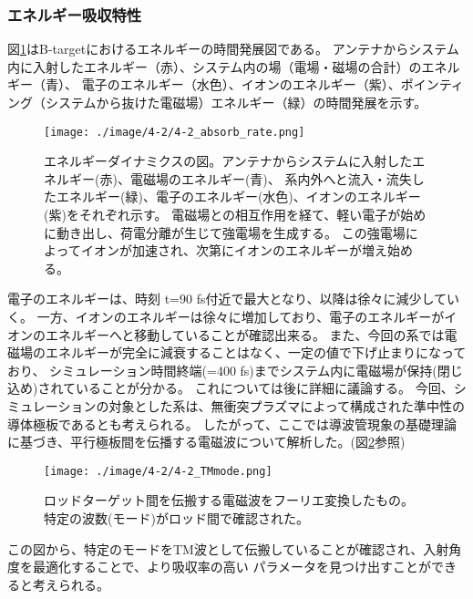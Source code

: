 \documentclass[a4paper,11pt,titlepage]{jsarticle}
\begin{document}
    \subsubsection{エネルギー吸収特性}
    図\ref{fig:4-2_absorb_rate}はB-targetにおけるエネルギーの時間発展図である。
    アンテナからシステム内に入射したエネルギー（赤）、システム内の場（電場・磁場の合計）のエネルギー（青）、
    電子のエネルギー（水色）、イオンのエネルギー（紫）、ポインティング（システムから抜けた電磁場）エネルギー（緑）の時間発展を示す。
    \begin{figure}[H]
      \begin{center}
        \texttt{[image: ./image/4-2/4-2\_absorb\_rate.png]}
        \caption{
          \label{fig:4-2_absorb_rate}
            エネルギーダイナミクスの図。アンテナからシステムに入射したエネルギー(赤)、電磁場のエネルギー(青)、
            系内外へと流入・流失したエネルギー(緑)、電子のエネルギー(水色)、イオンのエネルギー(紫)をそれぞれ示す。
            電磁場との相互作用を経て、軽い電子が始めに動き出し、荷電分離が生じて強電場を生成する。
            この強電場によってイオンが加速され、次第にイオンのエネルギーが増え始める。
        }
      \end{center}
    \end{figure} 
    電子のエネルギーは、時刻 t=90 fs付近で最大となり、以降は徐々に減少していく。
    一方、イオンのエネルギーは徐々に増加しており、電子のエネルギーがイオンのエネルギーへと移動していることが確認出来る。
    また、今回の系では電磁場のエネルギーが完全に減衰することはなく、一定の値で下げ止まりになっており、
    シミュレーション時間終端(=400 fs)までシステム内に電磁場が保持(閉じ込め)されていることが分かる。
    これについては後に詳細に議論する。
    今回、シミュレーションの対象とした系は、無衝突プラズマによって構成された準中性の導体極板であるとも考えられる。
    したがって、ここでは導波管現象の基礎理論に基づき、平行極板間を伝播する電磁波について解析した。(図\ref{fig:4-2_TMmode}参照)
    \begin{figure}[H]
      \begin{center}
        \texttt{[image: ./image/4-2/4-2\_TMmode.png]}
        \caption{
          \label{fig:4-2_TMmode}
          ロッドターゲット間を伝搬する電磁波をフーリエ変換したもの。
          特定の波数(モード)がロッド間で確認された。
        }
      \end{center}
    \end{figure} 
    この図から、特定のモードをTM波として伝搬していることが確認され、入射角度を最適化することで、より吸収率の高い
    パラメータを見つけ出すことができると考えられる。
\end{document}
